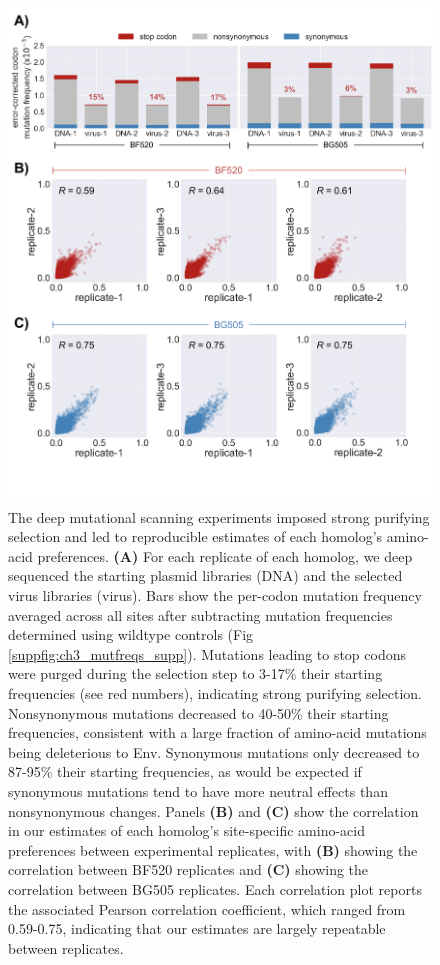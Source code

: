 \documentclass[9pt,lineno]{elife}
\begin{document}
\begin{figure}
\centerline{\includegraphics[width=5in]{figures/mutfreqs/mutfreqs}}
\caption{\label{fig:mutfreqs}
The deep mutational scanning experiments imposed strong purifying selection and led to reproducible estimates of each homolog's amino-acid preferences.
{\bf(A)} For each replicate of each homolog, we deep sequenced the starting plasmid libraries (DNA) and the selected virus libraries (virus).
Bars show the per-codon mutation frequency averaged across all sites after subtracting mutation frequencies determined using wildtype controls (Fig \ref{suppfig:ch3_mutfreqs_supp}).
Mutations leading to stop codons were purged during the selection step to 3-17\% their starting frequencies (see red numbers), indicating strong purifying selection.
Nonsynonymous mutations decreased to 40-50\% their starting frequencies, consistent with a large fraction of amino-acid mutations being deleterious to Env.
Synonymous mutations only decreased to 87-95\% their starting frequencies, as would be expected if synonymous mutations tend to have more neutral effects than nonsynonymous changes.
Panels {\bf(B)} and {\bf(C)} show the correlation in our estimates of each homolog's site-specific amino-acid preferences between experimental replicates, with {\bf(B)} showing the correlation between BF520 replicates and {\bf(C)} showing the correlation between BG505 replicates.
Each correlation plot reports the associated Pearson correlation coefficient, which ranged from 0.59-0.75, indicating that our estimates are largely repeatable between replicates.
}
\end{figure}
\end{document}
